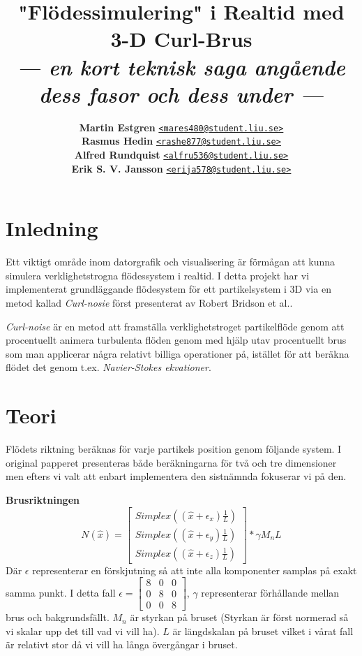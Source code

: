 \documentclass[a4paper]{article}
\title{\vspace{-2.5cm}\textbf{"Flödessimulering" i Realtid med 3-D Curl-Brus}\\
       \Large{\textit{--- en kort teknisk saga angående dess fasor och dess under ---}}}
\author{{\textbf{Martin Estgren}}\;\;\;\;\;\; {\href{mailto:mares480@student.liu.se}{\texttt{<mares480@student.liu.se>}}}\\
        {\textbf{Rasmus Hedin}}\;\;\;\;\;\;\;\; {\href{mailto:rashe877@student.liu.se}{\texttt{<rashe877@student.liu.se>}}}\\
        {\textbf{Alfred Rundquist}}\;\;\; {\href{mailto:alfru536@student.liu.se}{\texttt{<alfru536@student.liu.se>}}}\\
        {\textbf{Erik S. V. Jansson}}\; {\href{mailto:erija578@student.liu.se}{\texttt{<erija578@student.liu.se>}}}}
\begin{document}
    \maketitle

    \section{Inledning}

    Ett viktigt område inom datorgrafik och visualisering är förmågan att kunna simulera verklighetstrogna flödessystem i realtid. I detta projekt har vi implementerat grundläggande flödesystem för ett partikelsystem i 3D via en metod kallad \textit{Curl-nosie} först presenterat av Robert Bridson et al.\cite{bridson2007curl}.

    \textit{Curl-noise} är en metod att framställa verklighetstroget partikelflöde genom att procentuellt animera turbulenta flöden genom med hjälp utav procentuellt brus som man applicerar några relativt billiga operationer på, istället för att beräkna flödet det genom t.ex. \textit{Navier-Stokes ekvationer}. 

    \section{Teori}

    Flödets riktning beräknas för varje partikels position genom följande system. I original papperet presenteras både beräkningarna för två och tre dimensioner men efters vi valt att enbart implementera den sistnämnda fokuserar vi på den.

    \textbf{Brusriktningen}
    \begin{equation}
        N(\hat{x}) =  
        \begin{bmatrix}
        Simplex((\hat{x} + \epsilon_x)\frac{1}{L})
        \\
        Simplex((\hat{x} + \epsilon_y)\frac{1}{L})
        \\ 
        Simplex((\hat{x} + \epsilon_z)\frac{1}{L})
        \end{bmatrix} * \gamma M_nL
    \end{equation}
    Där $\epsilon$ representerar en förskjutning så att inte alla komponenter samplas på exakt samma punkt. I detta fall $\epsilon = \begin{bmatrix}
8 & 0 & 0\\ 
0 & 8 & 0\\ 
0 & 0 & 8
\end{bmatrix}$, $\gamma$ representerar förhållande mellan brus och bakgrundsfällt. $M_n$ är styrkan på bruset (Styrkan är först normerad så vi skalar upp det till vad vi vill ha). $L$ är längdskalan på bruset vilket i vårat fall är relativt stor då vi vill ha långa övergångar i bruset.
\end{document}
